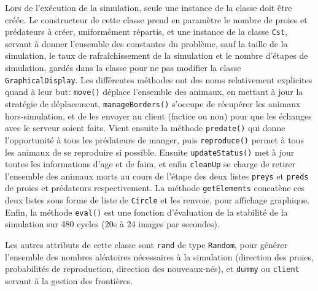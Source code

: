 \documentclass[12pt,a4paper,titlepage]{article}
\begin{document}
Lors de l'exécution de la simulation, seule une instance de la classe doit être créée. Le constructeur de cette classe prend en paramètre le nombre de proies et prédateurs à créer, uniformément répartis, et une instance de la classe \texttt{Cst}, servant à donner l'ensemble des constantes du problème, sauf la taille de la simulation, le taux de rafraîchissement de la simulation et le nombre d'étapes de simulation, gardés dans la classe pour ne pas modifier la classe \texttt{GraphicalDisplay}. 
Les différentes méthodes ont des noms relativement explicites quand à leur but: \texttt{move()} déplace l'ensemble des animaux, en mettant à jour la stratégie de déplacement, \texttt{manageBorders()} s'occupe de récupérer les animaux hors-simulation, et de les envoyer au client (factice ou non) pour que les échanges avec le serveur soient faits. Vient ensuite la méthode \texttt{predate()} qui donne l'opportunité à tous les prédateurs de manger, puis \texttt{reproduce()} permet à tous les animaux de se reproduire si possible. Ensuite \texttt{updateStatus()} met à jour toutes les informations d'age et de faim, et enfin \texttt{cleanUp}  se charge de retirer l'ensemble des animaux morts au cours de l'étape des deux listes \texttt{preys} et \texttt{preds} de proies et prédateurs respectivement. La méthode \texttt{getElements} concatène ces deux listes sous forme de liste de \texttt{Circle} et les renvoie, pour affichage graphique. Enfin, la méthode \texttt{eval()} est une fonction d'évaluation de la stabilité de la simulation sur 480 cycles (20s à 24 images par secondes).

Les autres attributs de cette classe sont \texttt{rand} de type \texttt{Random}, pour générer l'ensemble des nombres aléatoires nécessaires à la simulation (direction des proies, probabilités de reproduction, direction des nouveaux-nés), et \texttt{dummy} ou \texttt{client} servant à la gestion des frontières.
\FloatBarrier
\end{document}
